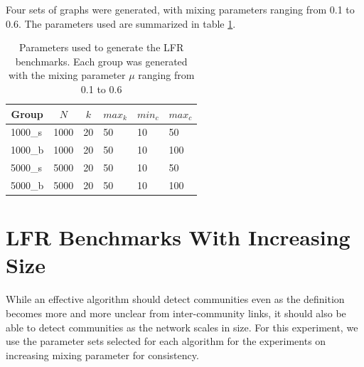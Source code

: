 Four sets of graphs were generated, with mixing parameters ranging from 0.1 to 0.6. The parameters used are summarized in table \ref{lfrparam}.

\begin{table}[h!]
	\centering
	\begin{tabular}{|l | l| l | l | l | l |} 
		\hline
		\multicolumn{1}{|c|}{\textbf{Group}} & 
		\multicolumn{1}{|c|}{\textbf{$N$}}  &  
		\multicolumn{1}{|c|}{\textbf{$k$}}  &  
		\multicolumn{1}{|c|}{\textbf{$max_k$}} &
		\multicolumn{1}{|c|}{\textbf{$min_c$}} & 
		\multicolumn{1}{|c|}{\textbf{$max_c$}}\\
		\hline
		\hline
		1000\_s & 1000 & 20 & 50 & 10 & 50\\ 
		\hline
		1000\_b & 1000 & 20 & 50 & 10 & 100\\ 
		\hline
		5000\_s & 5000 & 20 & 50 &10 & 50\\ 
		\hline
		5000\_b & 5000& 20 & 50 & 10 & 100\\
		\hline
	\end{tabular}
	\caption{Parameters used to generate the LFR benchmarks. Each group was generated with the mixing parameter $\mu$ ranging from 0.1 to 0.6}
	\label{lfrparam}
\end{table}








\section{LFR Benchmarks With Increasing Size}
While an effective algorithm should detect communities even as the definition becomes more and more unclear from inter-community links, it should also be able to detect communities as the network scales in size. For this experiment, we use the parameter sets selected for each algorithm for the experiments on increasing mixing parameter for consistency.


